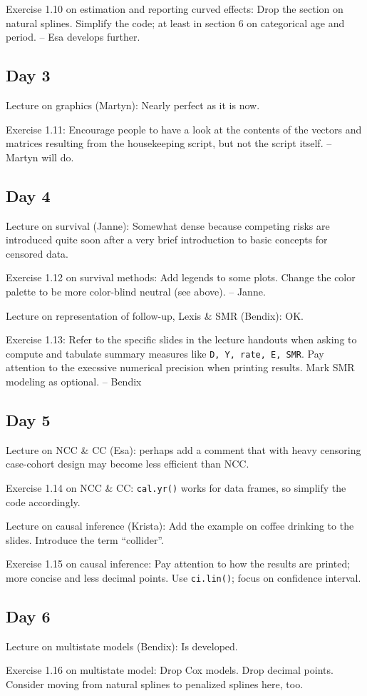 Exercise 1.10 on estimation and reporting curved effects: Drop the section on natural splines. 
Simplify the code; at least in section 6 on categorical age and period. -- Esa develops further.

\subsection*{Day 3}

Lecture on graphics (Martyn): Nearly perfect as it is now.

Exercise 1.11: Encourage people to have a look at the contents
of the vectors and matrices resulting from the housekeeping script, but
not the script itself.  -- Martyn will do.

\subsection*{Day 4}

Lecture on survival (Janne): Somewhat dense because competing risks are introduced quite soon after
a very brief introduction to basic concepts for censored data.   

Exercise 1.12 on survival methods: Add legends to some plots. Change the color palette to be 
more color-blind neutral (see above). -- Janne.  

Lecture on representation of follow-up, Lexis \& SMR (Bendix): OK.

Exercise 1.13: Refer to the specific slides in the lecture handouts 
when asking to compute and tabulate summary measures like {\tt D, Y, rate, E, SMR}.
Pay attention to the execssive numerical precision when printing results. Mark SMR modeling as optional. -- Bendix


\subsection*{Day 5}

Lecture on NCC \& CC (Esa): perhaps add a comment that with heavy 
censoring case-cohort design may become less efficient than NCC.

Exercise 1.14 on NCC \& CC: {\tt cal.yr()} works for data frames, so simplify the code accordingly. 

Lecture on causal inference (Krista): Add the example on coffee drinking to the slides. 
Introduce the term ``collider''. 

Exercise 1.15 on causal inference: Pay attention to how the results are printed; more concise
and less decimal points. Use {\tt ci.lin()}; focus on confidence interval.

\subsection*{Day 6}

Lecture on multistate models (Bendix): Is developed.

Exercise 1.16 on multistate model: Drop Cox models. Drop decimal points. Consider moving from
natural splines to penalized splines here, too.



